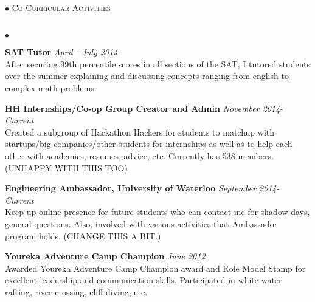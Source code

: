 \documentclass{article}
\newcommand{\lineunder}{\vspace*{-8pt} \\ \hspace*{-18pt} \hrulefill \\}
\newcommand{\header}[1]{{\hspace*{-15pt}\vspace*{6pt} \textsc{#1}} \vspace*{-6pt} \lineunder}
\newenvironment{achievements}{\begin{list}{$\bullet$}{\topsep 0pt \itemsep -1.5pt \leftmargin 5pt}}{\vspace*{4pt}\end{list}}
\begin{document}
\begin{achievements}
\header{Co-Curricular Activities}
\begin{achievements}
\item \textbf{SAT Tutor} \hfill \textit {April - July 2014}
\\ After securing 99th percentile scores in all sections of the SAT, I tutored students over the summer explaining and discussing concepts ranging from english to complex math problems.
\end{achievements}
\item \textbf{HH Internships/Co-op Group Creator and Admin} \hfill \textit {November 2014- Current}
\\ Created a subgroup of Hackathon Hackers for students to matchup with startups/big companies/other students for internships as well as to help each other with academics, resumes, advice, etc. Currently has 538 members.(UNHAPPY WITH THIS TOO)
\item \textbf{Engineering Ambassador, University of Waterloo} \hfill \textit {September 2014- Current}
\\Keep up online presence for future students who can contact me for shadow days, general questions. Also, involved with various activities that Ambassador program holds. (CHANGE THIS A BIT.)
\item \textbf{Youreka Adventure Camp Champion} \hfill \textit {June 2012}
\\ Awarded Youreka Adventure Camp Champion award and Role Model Stamp for excellent leadership and communication skills. Participated in white water rafting, river crossing, cliff diving, etc.
\end{achievements}

\newpage
\end{document}
